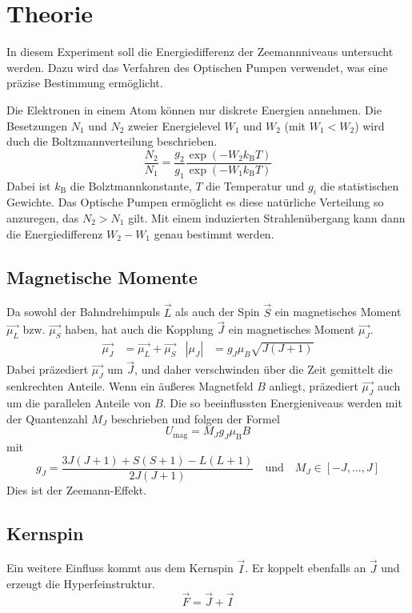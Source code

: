 \section{Theorie}
\label{sec:Theorie}
In diesem Experiment soll die Energiedifferenz der Zeemannniveaus untersucht werden. Dazu wird das Verfahren des Optischen Pumpen verwendet, was eine präzise Bestimmung ermöglicht.

Die Elektronen in einem Atom können nur diskrete Energien annehmen. Die Besetzungen $N_1$ und $N_2$  zweier Energielevel $W_1$ und $W_2$ (mit $W_1<W_2$) wird duch die Boltzmannverteilung beschrieben.
\begin{equation}
	\frac{N_2}{N_1}=\frac{g_2}{g_1}\frac{\exp(-W_2k_\mathrm{B}T)}{\exp(-W_1k_\mathrm{B}T)}
	\label{eqn:Bolztmann}
\end{equation}
Dabei ist $k_\mathrm{B}$ die Bolztmannkonstante, $T$ die Temperatur und $g_i$ die statistischen Gewichte. Das Optische Pumpen ermöglicht es diese natürliche Verteilung so anzuregen, das $N_2 > N_1$ gilt. Mit einem induzierten Strahlenübergang kann dann die Energiedifferenz $W_2-W_1$ genau bestimmt werden.
\subsection{Magnetische Momente}
Da sowohl der Bahndrehimpuls $\vec{L}$ als auch der Spin $\vec{S}$ ein magnetisches Moment $\vec{\mu_L}$ bzw. $\vec{\mu_S}$ haben, hat auch die Kopplung $\vec{J}$ ein magnetisches Moment $\vec{\mu_J}$.
\begin{align}
	\vec{\mu_J}&=\vec{\mu_L} +\vec{\mu_S} & \left| \mu_J \right|&=g_J\mu_B\sqrt{J(J+1)}
\end{align}
Dabei präzediert $\vec{\mu_J}$ um $\vec{J}$, und daher verschwinden über die Zeit gemittelt die senkrechten Anteile.
Wenn ein äußeres Magnetfeld $B$ anliegt, präzediert $\vec{\mu_J}$ auch um die parallelen Anteile von $B$. Die so beeinflussten Energieniveaus werden mit der Quantenzahl $M_J$ beschrieben und folgen der Formel
\begin{equation}
	U_\mathrm{mag} = M_J g_J \mu_\mathrm{B}B
\end{equation}
mit
\begin{equation}
	g_J=\frac{3J(J+1)+S(S+1)-L(L+1)}{2J(J+1)} \quad \text{und}\quad M_J \in [-J,...,J]
\end{equation}
Dies ist der Zeemann-Effekt.
\subsection{Kernspin}
Ein weitere Einfluss kommt aus dem Kernspin $\vec{I}$. Er koppelt ebenfalls an $\vec{J}$ und erzeugt die Hyperfeinstruktur.
\begin{equation}
	\vec{F}=\vec{J} +\vec{I}
\end{equation}
